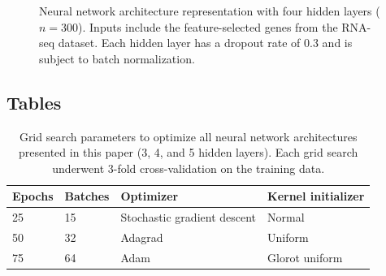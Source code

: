 \documentclass[10pt, letterpaper]{article}
\begin{document}
\begin{figure}[!ht]
    \caption{Neural network architecture representation with four hidden layers ($n=300$). Inputs include the feature-selected genes from the RNA-seq dataset. Each hidden layer has a dropout rate of 0.3 and is subject to batch normalization.}
    \label{fig:neural_vis}
\end{figure}


\subsection*{Tables}
\begin{table}[!ht]
    \caption{Grid search parameters to optimize all neural network architectures presented in this paper (3, 4, and 5 hidden layers). Each grid search underwent 3-fold cross-validation on the training data.}
    \centering
    \label{tab:params}
    \begin{tabular}{l l l l}
        \toprule
        Epochs & Batches & Optimizer & Kernel initializer \\
        \midrule
        25 & 15 & Stochastic gradient descent & Normal \\
        50 & 32 & Adagrad & Uniform \\
        75 & 64 & Adam & Glorot uniform \\
        \bottomrule
    \end{tabular}
\end{table}
\end{document}
